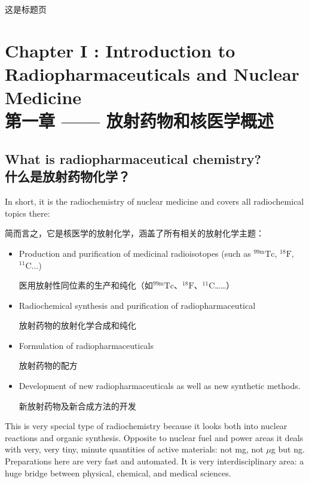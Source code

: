 \documentclass[dvipsnames, svgnames,a4paper,11pt]{article}
\begin{document}
\begin{titlepage}
    这是标题页
\end{titlepage}

\tableofcontents

\newpage

\section{Chapter I : Introduction to Radiopharmaceuticals and Nuclear Medicine \\ 第一章 —— 放射药物和核医学概述}

\subsection{What is radiopharmaceutical chemistry?\\什么是放射药物化学？}

In short, it is the radiochemistry of nuclear medicine and covers all radiochemical topics there:

简而言之，它是核医学的放射化学，涵盖了所有相关的放射化学主题：

\begin{itemize}
      \item Production and purification of medicinal radioisotopes (such as ${}^\text{99m}\text{Tc}$, ${}^{18}\text{F}$, ${}^{11}\text{C}$...)

            医用放射性同位素的生产和纯化（如${}^\text{99m}\text{Tc}$、${}^{18}\text{F}$、${}^{11}\text{C}$……）

      \item Radiochemical synthesis and purification of radiopharmaceutical

            放射药物的放射化学合成和纯化

      \item Formulation of radiopharmaceuticals

            放射药物的配方

      \item Development of new radiopharmaceuticals as well as new synthetic methods.

            新放射药物及新合成方法的开发
\end{itemize}

This is very special type of radiochemistry because it looks both into nuclear reactions and organic synthesis. Opposite to nuclear fuel and power areas it deals with very, very tiny, minute quantities of active materials: not mg, not $\mu$g but ng.  Preparations here are very fast and automated. It is very interdisciplinary area: a huge bridge between physical, chemical, and medical sciences.
\end{document}
